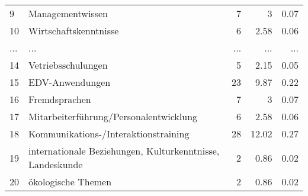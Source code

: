 \begin{longtable}{lXrrr}
        9 & \multicolumn{1}{X}{Managementwissen} & %
          \num{7} &
          \num[round-mode=places,round-precision=2]{3} &
          \num[round-mode=places,round-precision=2]{0.07} \\
        10 & \multicolumn{1}{X}{Wirtschaftskenntnisse} & %
          \num{6} &
          \num[round-mode=places,round-precision=2]{2.58} &
          \num[round-mode=places,round-precision=2]{0.06} \\
       ... & ... & ... & ... & ... \\
        14 & \multicolumn{1}{X}{Vetriebsschulungen} & %
          \num{5} &
          \num[round-mode=places,round-precision=2]{2.15} &
          \num[round-mode=places,round-precision=2]{0.05} \\

        15 & \multicolumn{1}{X}{EDV-Anwendungen} & %
          \num{23} &
          \num[round-mode=places,round-precision=2]{9.87} &
          \num[round-mode=places,round-precision=2]{0.22} \\

        16 & \multicolumn{1}{X}{Fremdsprachen} & %
          \num{7} &
          \num[round-mode=places,round-precision=2]{3} &
          \num[round-mode=places,round-precision=2]{0.07} \\

        17 & \multicolumn{1}{X}{Mitarbeiterführung/Personalentwicklung} & %
          \num{6} &
          \num[round-mode=places,round-precision=2]{2.58} &
          \num[round-mode=places,round-precision=2]{0.06} \\

        18 & \multicolumn{1}{X}{Kommunikations-/Interaktionstraining} & %
          \num{28} &
          \num[round-mode=places,round-precision=2]{12.02} &
          \num[round-mode=places,round-precision=2]{0.27} \\

        19 & \multicolumn{1}{X}{internationale Beziehungen, Kulturkenntnisse, Landeskunde} & %
          \num{2} &
          \num[round-mode=places,round-precision=2]{0.86} &
          \num[round-mode=places,round-precision=2]{0.02} \\

        20 & \multicolumn{1}{X}{ökologische Themen} & %
          \num{2} &
          \num[round-mode=places,round-precision=2]{0.86} &
          \num[round-mode=places,round-precision=2]{0.02} \\


\end{longtable}
